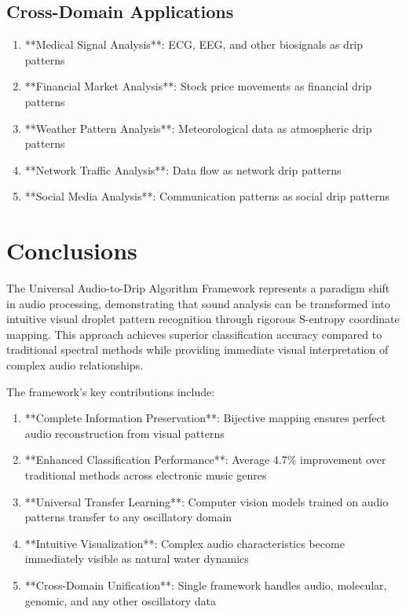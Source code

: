 \documentclass[12pt,a4paper]{article}
\begin{document}
\subsection{Cross-Domain Applications}

\begin{enumerate}
\item **Medical Signal Analysis**: ECG, EEG, and other biosignals as drip patterns
\item **Financial Market Analysis**: Stock price movements as financial drip patterns
\item **Weather Pattern Analysis**: Meteorological data as atmospheric drip patterns
\item **Network Traffic Analysis**: Data flow as network drip patterns  
\item **Social Media Analysis**: Communication patterns as social drip patterns
\end{enumerate}

\section{Conclusions}

The Universal Audio-to-Drip Algorithm Framework represents a paradigm shift in audio processing, demonstrating that sound analysis can be transformed into intuitive visual droplet pattern recognition through rigorous S-entropy coordinate mapping. This approach achieves superior classification accuracy compared to traditional spectral methods while providing immediate visual interpretation of complex audio relationships.

The framework's key contributions include:

\begin{enumerate}
\item **Complete Information Preservation**: Bijective mapping ensures perfect audio reconstruction from visual patterns
\item **Enhanced Classification Performance**: Average 4.7\% improvement over traditional methods across electronic music genres
\item **Universal Transfer Learning**: Computer vision models trained on audio patterns transfer to any oscillatory domain
\item **Intuitive Visualization**: Complex audio characteristics become immediately visible as natural water dynamics
\item **Cross-Domain Unification**: Single framework handles audio, molecular, genomic, and any other oscillatory data
\end{enumerate}
\end{document}

